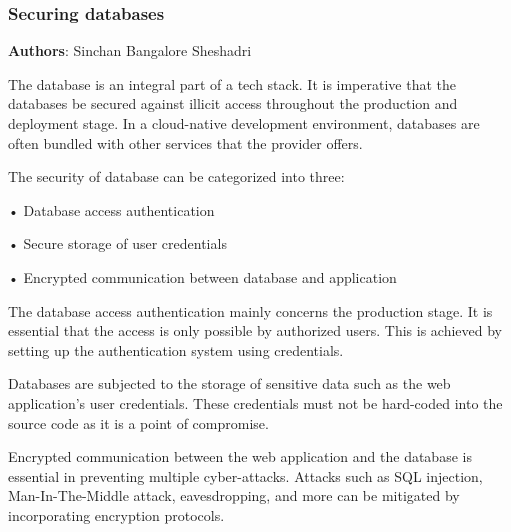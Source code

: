 \subsubsection{Securing databases}
\textbf{Authors}: Sinchan Bangalore Sheshadri

The database is an integral part of a tech stack. It is imperative that the databases be secured against illicit access throughout the production and deployment stage. In a cloud-native development environment, databases are often bundled with other services that the provider offers.

The security of database can be categorized into three:

•	Database access authentication

•	Secure storage of user credentials

•	Encrypted communication between database and application

The database access authentication mainly concerns the production stage. It is essential that the access is only possible by authorized users. This is achieved by setting up the authentication system using credentials.

Databases are subjected to the storage of sensitive data such as the web application’s user credentials. These credentials must not be hard-coded into the source code as it is a point of compromise.

Encrypted communication between the web application and the database is essential in preventing multiple cyber-attacks. Attacks such as SQL injection, Man-In-The-Middle attack, eavesdropping, and more can be mitigated by incorporating encryption protocols.
